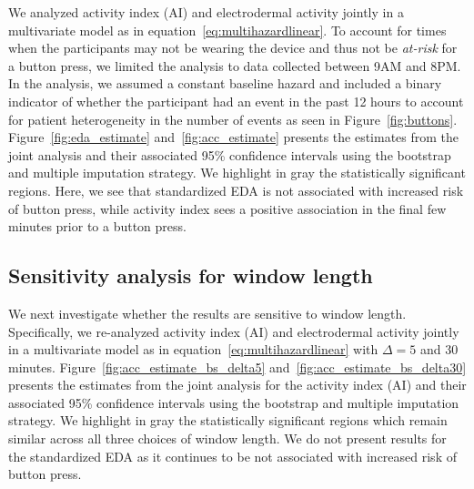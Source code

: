 \documentclass[12pt]{amsart}
\newenvironment{newmaterial}{\color{blue}}{\par}
\begin{document}
We analyzed activity index (AI) and electrodermal activity jointly in a multivariate model as in equation~\eqref{eq:multihazardlinear}.  To account for times when the participants may not be wearing the device and thus not be \emph{at-risk} for a button press, we limited the analysis to data collected between 9AM and 8PM.  In the analysis, we assumed a constant baseline hazard and included a binary indicator of whether the participant had an event in the past 12 hours to account for patient heterogeneity in the number of events as seen in Figure~\ref{fig:buttons}.   Figure~\ref{fig:eda_estimate} and~\ref{fig:acc_estimate} presents the estimates from the joint analysis and their associated 95\% confidence intervals using the bootstrap and multiple imputation strategy.  We highlight in gray the statistically significant regions.  Here, we see that standardized EDA is not associated with increased risk of button press, while activity index sees a positive association in the final few minutes prior to a button press.



 \subsection{Sensitivity analysis for window length}
\label{sec:missingdata_heterogeneity}


 We next investigate whether the results are sensitive to window length. Specifically, we re-analyzed activity index (AI) and electrodermal activity jointly in a multivariate model as in equation~\eqref{eq:multihazardlinear} with $\Delta = 5$ and $30$ minutes.  Figure~\ref{fig:acc_estimate_bs_delta5} and~\ref{fig:acc_estimate_bs_delta30} presents the estimates from the joint analysis for the activity index (AI) and their associated 95\% confidence intervals using the bootstrap and multiple imputation strategy.  We highlight in gray the statistically significant regions which remain similar across all three choices of window length.  We do not present results for the standardized EDA as it continues to be not associated with increased risk of button press.
\end{document}
